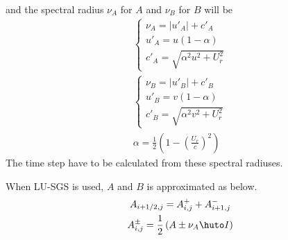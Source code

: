 \documentclass{jsarticle}
\newcommand{\bI}{\huto I}
\begin{document}
and the spectral radius $\nu _A$ for $A$ and $\nu _B$ for $B$ will be
\begin{gather}
\begin{cases}
\nu _A = |u'_A|+c'_A\\
u'_A = u (1-\alpha)\\
c'_A = \sqrt{\alpha^2 u^2+U_r^2}
\end{cases}\\
\begin{cases}
\nu _B = |u'_B|+c'_B\\
u'_B = v (1-\alpha)\\
c'_B = \sqrt{\alpha^2 v^2+U_r^2}
\end{cases}\\
\alpha = \frac 1 2 \left( 1-\left( \frac{U_r}{c} \right) ^2\right)
\end{gather}
The time step have to be calculated from these spectral radiuses.

When LU-SGS is used, $A$ and $B$ is approximated as below.
\begin{gather}
A_{i+1/2,j}=A^+_{i,j}+A^-_{i+1,j}\\
A^\pm_{i,j}=\frac 1 2 \left( A \pm \nu_A \bI\right)
\end{gather}
\end{document}
